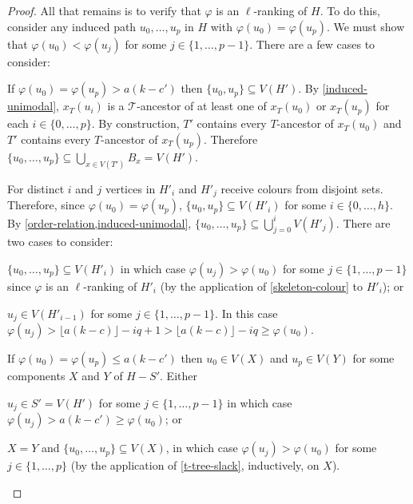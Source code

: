 \documentclass[kpfonts]{patmorin}
\theoremstyle{named}
\begin{document}
\begin{proof}
   All that remains is to verify that $\varphi$ is an $\ell$-ranking of $H$. To do this, consider any induced path $u_0,\ldots,u_p$ in $H$ with $\varphi(u_0)=\varphi(u_p)$.
   We must show that $\varphi(u_0)<\varphi(u_j)$ for some $j\in\{1,\ldots,p-1\}$. There are a few cases to consider:
   \begin{compactenum}
        \item If $\varphi(u_0)=\varphi(u_p) > a(k-c')$ then $\{u_0,u_p\}\subseteq V(H')$.  By \cref{induced-unimodal}, $x_T(u_i)$ is a $\mathcal{T}$-ancestor of at least one of $x_T(u_0)$ or $x_T(u_p)$ for each $i\in\{0,\ldots,p\}$.  By construction, $T'$ contains every $T$-ancestor of $x_T(u_0)$ and $T'$ contains every $T$-ancestor of $x_T(u_p)$.  Therefore $\{u_0,\ldots,u_p\}\subseteq \bigcup_{x\in V(T')} B_x=V(H')$.

        For distinct $i$ and $j$ vertices in $H'_i$ and $H'_j$ receive colours from disjoint sets.  Therefore, since $\varphi(u_0)=\varphi(u_p)$,  $\{u_0,u_p\}\subseteq V(H'_i)$ for some $i\in\{0,\ldots,h\}$.  By \cref{order-relation,induced-unimodal}, $\{u_0,\ldots,u_{p}\}\subseteq \bigcup_{j=0}^{i} V(H'_j)$.  There are two cases to consider:
        \begin{compactenum}
           \item $\{u_0,\ldots,u_{p}\}\subseteq V(H'_i)$ in which case $\varphi(u_j)>\varphi(u_0)$ for some $j\in\{1,\ldots,p-1\}$ since $\varphi$ is an $\ell$-ranking of $H'_i$ (by the application of \cref{skeleton-colour} to $H'_i$); or
           \item $u_j\in V(H'_{i-1})$ for some $j\in\{1,\ldots,p-1\}$.  In this case $\varphi(u_j)>\lfloor a(k-c)\rfloor-iq + 1 > \lfloor a(k-c)\rfloor-iq \ge \varphi(u_0)$.
       \end{compactenum}
       \item If $\varphi(u_0)=\varphi(u_p) \le a(k-c')$ then $u_0\in V(X)$ and $u_p\in V(Y)$ for some components $X$ and $Y$ of $H-S'$.  Either
       \begin{compactenum}
            \item $u_j\in S'=V(H')$ for some $j\in\{1,\ldots,p-1\}$ in which case $\varphi(u_j)>a(k-c')\ge\varphi(u_0)$; or
            \item $X=Y$ and $\{u_0,\ldots,u_p\}\subseteq V(X)$, in which case $\varphi(u_j)>\varphi(u_0)$ for some $j\in\{1,\ldots,p\}$ (by the application of \cref{t-tree-slack}, inductively, on $X$). \qedhere
        \end{compactenum}
    \end{compactenum}
\end{proof}
\end{document}
